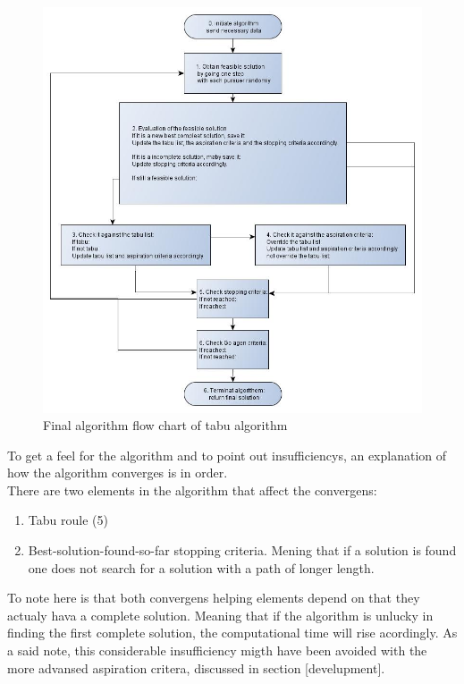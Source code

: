 \begin{figure}[!h]
	\centering
	\includegraphics[width=\textwidth]{chapter_4_methods/tabu_ny.jpg}
  	\caption[Final algorithm flow chart of tabu algorithm]
  	{Final algorithm flow chart of tabu algorithm}
\end{figure}

To get a feel for the algorithm and to point out insufficiencys, an explanation of how the algorithm converges is in order.\\
There are two elements in the algorithm that affect the convergens:
\begin{enumerate}
\item{} Tabu roule (5)
\item{} Best-solution-found-so-far stopping criteria. 
\subitem{} Mening that if a solution is found one does not search for a solution with a path of longer length.
\end{enumerate}
To note here is that both convergens helping elements depend on that they actualy hava a complete solution. Meaning that if the algorithm is unlucky in finding the first complete solution, the computational time will rise acordingly. As a said note, this considerable insufficiency migth have been avoided with the more advansed aspiration critera, discussed in section [develupment].

